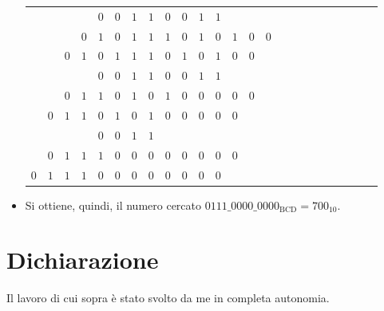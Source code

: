 \documentclass[a4paper]{extarticle}
\begin{document}
\begin{itemize}
\begin{table}[H]
\begin{tabular}{|cccc|cccc|cccc|cccccccccccc}
            &&&&\cellcolor{cyan!25!white}$0$\cellcolor{cyan!25!white}&\cellcolor{cyan!25!white}$0$&\cellcolor{cyan!25!white}$1$&\cellcolor{cyan!25!white}$1$&\cellcolor{cyan!25!white}$0$\cellcolor{cyan!25!white}&\cellcolor{cyan!25!white}$0$&\cellcolor{cyan!25!white}$1$&\cellcolor{cyan!25!white}$1$&&&&&&&&&&&&\\
    
            &&&$0$&$1$&$0$&$1$&$1$&$1$&$0$&$1$&$0$&$1$&$0$&$0$&&&&&&&&&\\
            &&$0$&$1$&\cellcolor{cyan!25!white}$0$&\cellcolor{cyan!25!white}$1$&\cellcolor{cyan!25!white}$1$&\cellcolor{cyan!25!white}$1$&\cellcolor{cyan!25!white}$0$&\cellcolor{cyan!25!white}$1$&\cellcolor{cyan!25!white}$0$&\cellcolor{cyan!25!white}$1$&$0$&$0$&&&&&&&&&&\\
    
            &&&&\cellcolor{cyan!25!white}$0$\cellcolor{cyan!25!white}&\cellcolor{cyan!25!white}$0$&\cellcolor{cyan!25!white}$1$&\cellcolor{cyan!25!white}$1$&\cellcolor{cyan!25!white}$0$\cellcolor{cyan!25!white}&\cellcolor{cyan!25!white}$0$&\cellcolor{cyan!25!white}$1$&\cellcolor{cyan!25!white}$1$&&&&&&&&&&&&\\
    
            &&$0$&$1$&$1$&$0$&$1$&$0$&$1$&$0$&$0$&$0$&$0$&$0$&&&&&&&&&&\\
            &$0$&$1$&$1$&\cellcolor{cyan!25!white}$0$&\cellcolor{cyan!25!white}$1$&\cellcolor{cyan!25!white}$0$&\cellcolor{cyan!25!white}$1$&$0$&$0$&$0$&$0$&$0$&&&&&&&&&&&\\
            &&&&\cellcolor{cyan!25!white}$0$\cellcolor{cyan!25!white}&\cellcolor{cyan!25!white}$0$&\cellcolor{cyan!25!white}$1$&\cellcolor{cyan!25!white}$1$&&&&&&&&&&&&&&&&\\
            &$0$&$1$&$1$&$1$&$0$&$0$&$0$&$0$&$0$&$0$&$0$&$0$&&&&&&&&&&\\
            $0$&$1$&$1$&$1$&$0$&$0$&$0$&$0$&$0$&$0$&$0$&$0$&&&&&&&&&&&\\
            
        \end{tabular}
        \end{table}

        \item Si ottiene, quindi, il numero cercato $0111\_0000\_0000_{\text{BCD}} = 700_{10}$.
    \end{itemize}

\noindent
\section{Dichiarazione}
Il lavoro di cui sopra è stato svolto da me in completa autonomia.
\end{document}
